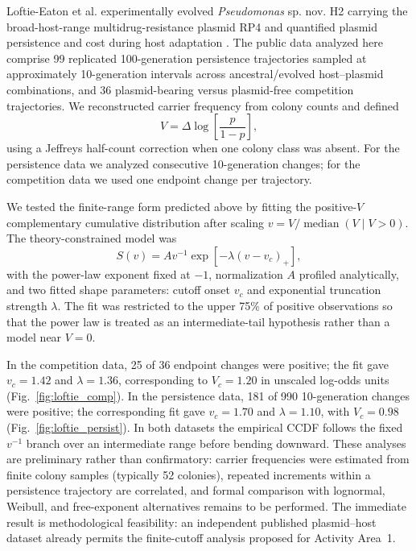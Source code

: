 \documentclass[12pt,a4paper]{article}
\begin{document}
Loftie-Eaton et al. experimentally evolved \emph{Pseudomonas} sp. nov. H2 carrying the broad-host-range multidrug-resistance plasmid RP4 and quantified plasmid persistence and cost during host adaptation \citep{loftieeaton2017}. The public data analyzed here comprise 99 replicated 100-generation persistence trajectories sampled at approximately 10-generation intervals across ancestral/evolved host--plasmid combinations, and 36 plasmid-bearing versus plasmid-free competition trajectories. We reconstructed carrier frequency from colony counts and defined
\[
V=\Delta\log\!\left[\frac{p}{1-p}\right],
\]
using a Jeffreys half-count correction when one colony class was absent. For the persistence data we analyzed consecutive 10-generation changes; for the competition data we used one endpoint change per trajectory.

We tested the finite-range form predicted above by fitting the positive-$V$ complementary cumulative distribution after scaling $v=V/\operatorname{median}(V\mid V>0)$. The theory-constrained model was
\begin{equation}
S(v)=A v^{-1}\exp\!\left[-\lambda(v-v_c)_+\right],
\label{eq:prelim_truncated_tail}
\end{equation}
with the power-law exponent fixed at $-1$, normalization $A$ profiled analytically, and two fitted shape parameters: cutoff onset $v_c$ and exponential truncation strength $\lambda$. The fit was restricted to the upper 75\% of positive observations so that the power law is treated as an intermediate-tail hypothesis rather than a model near $V=0$.

In the competition data, 25 of 36 endpoint changes were positive; the fit gave $v_c=1.42$ and $\lambda=1.36$, corresponding to $V_c=1.20$ in unscaled log-odds units (Fig.~\ref{fig:loftie_comp}). In the persistence data, 181 of 990 10-generation changes were positive; the corresponding fit gave $v_c=1.70$ and $\lambda=1.10$, with $V_c=0.98$ (Fig.~\ref{fig:loftie_persist}). In both datasets the empirical CCDF follows the fixed $v^{-1}$ branch over an intermediate range before bending downward. These analyses are preliminary rather than confirmatory: carrier frequencies were estimated from finite colony samples (typically 52 colonies), repeated increments within a persistence trajectory are correlated, and formal comparison with lognormal, Weibull, and free-exponent alternatives remains to be performed. The immediate result is methodological feasibility: an independent published plasmid--host dataset already permits the finite-cutoff analysis proposed for Activity Area~1.
\end{document}
